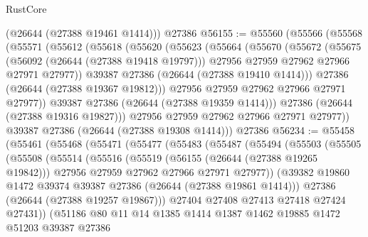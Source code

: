 \begin{lexlean}{RustCore}
\begin{coremodule}
      (@26644 (@27388 @19461 @1414)))
    @27386
@56155 := @55560
    (@55566
      (@55568
        (@55571
          (@55612
            (@55618
              (@55620
                (@55623
                  (@55664
                    (@55670
                      (@55672
                        (@55675
                          (@56092 (@26644 (@27388 @19418 @19797)))
                          @27956
                          @27959
                          @27962
                          @27966
                          @27971
                          @27977))
                      @39387
                      @27386
                      (@26644 (@27388 @19410 @1414)))
                    @27386
                    (@26644 (@27388 @19367 @19812)))
                  @27956
                  @27959
                  @27962
                  @27966
                  @27971
                  @27977))
              @39387
              @27386
              (@26644 (@27388 @19359 @1414)))
            @27386
            (@26644 (@27388 @19316 @19827)))
          @27956
          @27959
          @27962
          @27966
          @27971
          @27977))
      @39387
      @27386
      (@26644 (@27388 @19308 @1414)))
    @27386
@56234 := @55458
    (@55461
      (@55468
        (@55471
          (@55477
            (@55483
              (@55487
                (@55494
                  (@55503
                    (@55505
                      (@55508
                        (@55514
                          (@55516
                            (@55519
                              (@56155 (@26644 (@27388 @19265 @19842)))
                              @27956
                              @27959
                              @27962
                              @27966
                              @27971
                              @27977))
                          (@39382 @19860 @1472 @39374 @39387 @27386 (@26644 (@27388 @19861 @1414)))
                          @27386
                          (@26644 (@27388 @19257 @19867)))
                        @27404
                        @27408
                        @27413
                        @27418
                        @27424
                        @27431))
                    (@51186
                      @80
                      @11
                      @14
                      @1385
                      @1414
                      @1387
                      @1462
                      @19885
                      @1472
                      @51203
                      @39387
                      @27386

\end{coremodule}
\end{lexlean}
